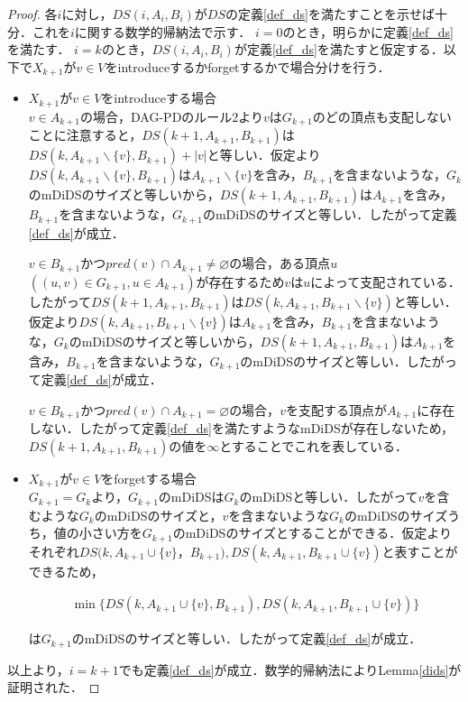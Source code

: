 \documentclass[master]{kuisthesis}		%
\theoremstyle{plain}
\theoremstyle{definition}
\begin{document}
\begin{proof}
    各$i$に対し，$DS(i, A_i, B_i)$が$DS$の定義\ref{def_ds}を満たすことを示せば十分．これを$i$に関する数学的帰納法で示す．
    $i=0$のとき，明らかに定義\ref{def_ds}を満たす．
    $i=k$のとき，$DS(i, A_i, B_i)$が定義\ref{def_ds}を満たすと仮定する．以下で$X_{k+1}$が$v \in V$をintroduceするかforgetするかで場合分けを行う．
    \begin{itemize}
        \item $X_{k+1}$が$v \in V$をintroduceする場合 \\
        $v \in A_{k+1}$の場合，DAG-PDのルール2より$v$は$G_{k+1}$のどの頂点も支配しないことに注意すると，$DS(k+1, A_{k+1}, B_{k+1})$は$DS(k, A_{k+1} \backslash \{v\}, B_{k+1}) + |{v}|$と等しい．仮定より$DS(k, A_{k+1} \backslash \{v\}, B_{k+1})$は$A_{k+1} \backslash \{v\}$を含み，$B_{k+1}$を含まないような，$G_k$のmDiDSのサイズと等しいから，$DS(k+1, A_{k+1}, B_{k+1})$は$A_{k+1}$を含み，$B_{k+1}$を含まないような，$G_{k+1}$のmDiDSのサイズと等しい．したがって定義\ref{def_ds}が成立．
        
        $v \in B_{k+1}$かつ$pred(v) \cap A_{k+1} \neq \varnothing$の場合，ある頂点$u$ $((u, v) \in G_{k+1}, u \in A_{k+1})$が存在するため$v$は$u$によって支配されている．したがって$DS(k+1, A_{k+1}, B_{k+1})$は$DS(k, A_{k+1}, B_{k+1} \backslash \{v\})$と等しい．仮定より$DS(k, A_{k+1}, B_{k+1} \backslash \{v\})$は$A_{k+1}$を含み，$B_{k+1}$を含まないような，$G_k$のmDiDSのサイズと等しいから，$DS(k+1, A_{k+1}, B_{k+1})$は$A_{k+1}$を含み，$B_{k+1}$を含まないような，$G_{k+1}$のmDiDSのサイズと等しい．したがって定義\ref{def_ds}が成立．

        $v \in B_{k+1}$かつ$pred(v) \cap A_{k+1} = \varnothing$の場合，$v$を支配する頂点が$A_{k+1}$に存在しない．したがって定義\ref{def_ds}を満たすようなmDiDSが存在しないため，$DS(k+1, A_{k+1}, B_{k+1})$の値を$\infty$とすることでこれを表している．
        
        \item $X_{k+1}$が$v \in V$をforgetする場合 \\
        $G_{k+1} = G_k$より，$G_{k+1}$のmDiDSは$G_k$のmDiDSと等しい．したがって$v$を含むような$G_k$のmDiDSのサイズと，$v$を含まないような$G_k$のmDiDSのサイズうち，値の小さい方を$G_{k+1}$のmDiDSのサイズとすることができる．仮定よりそれぞれ$DS(k, A_{k+1} \cup \{v\}$，$B_{k+1}), DS(k, A_{k+1}, B_{k+1} \cup \{v\})$と表すことができるため，
        
        \begin{align*}
            \min \{DS(k, A_{k+1} \cup \{v\}, B_{k+1}), DS(k, A_{k+1}, B_{k+1} \cup \{v\})\}
        \end{align*}
        
        は$G_{k+1}$のmDiDSのサイズと等しい．したがって定義\ref{def_ds}が成立．
    \end{itemize}
    以上より，$i = k+1$でも定義\ref{def_ds}が成立．数学的帰納法によりLemma\ref{dids}が証明された．
\end{proof}
\end{document}

